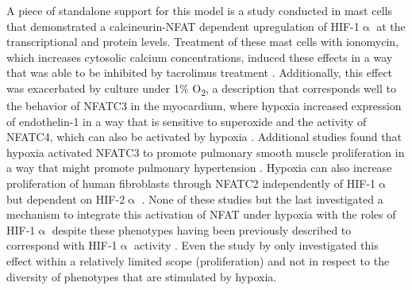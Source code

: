 A piece of standalone support for this model is a study conducted in mast cells that demonstrated a calcineurin\hyp{}NFAT dependent upregulation of HIF\hyp{}1$\upalpha$ at the transcriptional and protein levels. Treatment of these mast cells with ionomycin, which increases cytosolic calcium concentrations, induced these effects in a way that was able to be inhibited by tacrolimus treatment \citep{WalczakDrzewiecka2008}. Additionally, this effect was exacerbated by culture under 1\% O\textsubscript{2}, a description that corresponds well to the behavior of NFATC3 in the myocardium, where hypoxia increased expression of endothelin\hyp{}1 in a way that is sensitive to superoxide and the activity of NFATC4, which can also be activated by hypoxia \citep{deFrutos2011, RamiroDiaz2014, Moreno2015}. Additional studies found that hypoxia activated NFATC3 to promote pulmonary smooth muscle proliferation in a way that might promote pulmonary hypertension \citep{Hou2013}. Hypoxia can also increase proliferation of human fibroblasts through NFATC2 independently of HIF\hyp{}1$\upalpha$ but dependent on HIF\hyp{}2$\upalpha$ \citep{Senavirathna2018}. None of these studies but the last investigated a mechanism to integrate this activation of NFAT under hypoxia with the roles of HIF\hyp{}1$\upalpha$ despite these phenotypes having been previously described to correspond with HIF\hyp{}1$\upalpha$ activity \citep{Cui2021, Qi2017, Li2014, Thackaberry2002, SonanezOrganis2016}. Even the study by \citeauthor{Senavirathna2018} only investigated this effect within a relatively limited scope (proliferation) and not in respect to the diversity of phenotypes that are stimulated by hypoxia.

